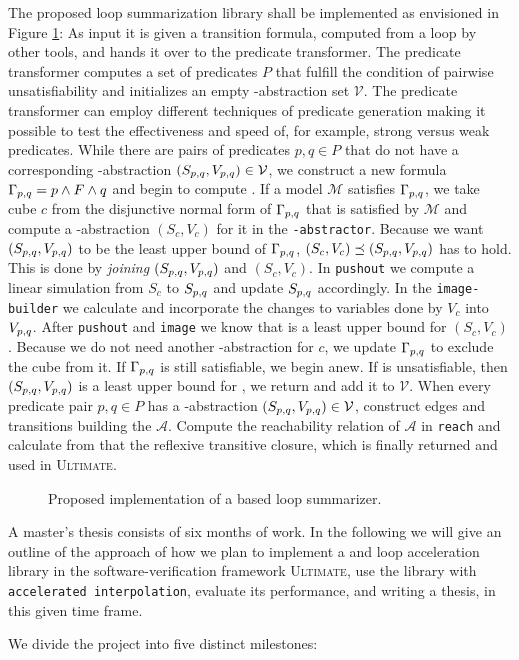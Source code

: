 
The proposed \qvasrs loop summarization library shall be implemented as envisioned in Figure \ref{fig}: As input it is given a transition formula, computed from a loop by other tools, and hands it over to the predicate transformer. The predicate transformer computes a set of predicates $P$ that fulfill the condition of pairwise unsatisfiability and initializes an empty \qvasr-abstraction set $\mathcal{V}$. The predicate transformer can employ different techniques of predicate generation making it possible to test the effectiveness and speed of, for example, strong versus weak predicates. While there are pairs of predicates $p, q \in P$ that do not have a corresponding \qvasr-abstraction $(S_{p, q}, V_{p, q}) \in \mathcal{V}$, we construct a new formula $\Gamma_{p, q} = p \land F \land q$ and begin to compute \pqvasr. If a model $\mathcal{M}$ satisfies $\Gamma_{p, q}$, we take cube $c$ from the disjunctive normal form of $\Gamma_{p, q}$ that is satisfied by $\mathcal{M}$ and compute a \qvasr-abstraction $(S_c, V_c)$ for it in the \texttt{\qvasr-abstractor}. Because we want $(S_{p, q}, V_{p, q})$ to be the least upper bound of $\Gamma_{p, q}$, $(S_c, V_c) \preceq (S_{p, q}, V_{p, q})$ has to hold. This is done by \textsl{joining} $(S_{p, q}, V_{p, q})$ and $(S_c, V_c)$. In \texttt{pushout} we compute a linear simulation from $S_c$ to $S_{p, q}$ and update $S_{p, q}$ accordingly. In the \texttt{image-builder} we calculate and incorporate the changes to variables done by $V_c$ into $V_{p, q}$. After \texttt{pushout} and \texttt{image} we know that \pqvasr is a least upper bound for $(S_c, V_c)$. Because we do not need another \qvasr-abstraction for $c$, we update $\Gamma_{p, q}$ to exclude the cube from it. If $\Gamma_{p, q}$ is still satisfiable, we begin anew.
If \pqformula is unsatisfiable, then $(S_{p, q}, V_{p, q})$ is a least upper bound for \pqformula, we return and add it to $\mathcal{V}$. When every predicate pair $p, q \in P$ has a \qvasr-abstraction $(S_{p, q}, V_{p, q}) \in \mathcal{V}$, construct edges and transitions building the \qvasrs $\mathcal{A}$. Compute the reachability relation of $\mathcal{A}$ in \texttt{reach} and calculate from that the reflexive transitive closure, which is finally returned and used in \textsc{Ultimate}.
\begin{figure}[H]
    
    \caption{Proposed implementation of a \qvasrs based loop summarizer.}
    \label{fig}
\end{figure}

A master's thesis consists of six months of work. In the following we will give an outline of the approach of how we plan to implement a \qvasr and \qvasrs loop acceleration library in the software-verification framework \textsc{Ultimate}, use the library with \texttt{accelerated interpolation}, evaluate its performance, and writing a thesis, in this given time frame. \\ \par
We divide the project into five distinct milestones:

